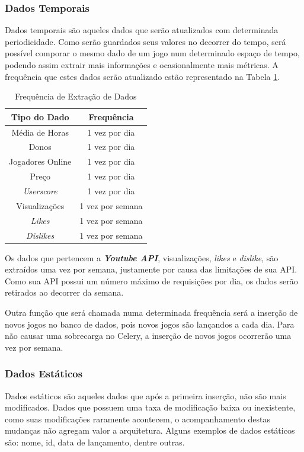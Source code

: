 \subsubsection{Dados Temporais}
Dados temporais são aqueles dados que serão atualizados com determinada periodicidade. Como serão guardados seus valores no decorrer do tempo, será possível comporar o mesmo dado de um jogo num determinado espaço de tempo, podendo assim extrair mais informações e ocasionalmente mais métricas. A frequência que estes dados serão atualizado estão representado na Tabela \ref{table:frequencia}.
\begin{table} [H]
\centering
\caption{Frequência de Extração de Dados}
\label{table:frequencia}

\begin{tabular} {c|c}
\hline \textbf{Tipo do Dado}&\textbf{Frequência} \\
\hline Média de Horas&1 vez por dia \\
\hline Donos&1 vez por dia \\
\hline Jogadores Online&1 vez por dia \\
\hline Preço&1 vez por dia \\
\hline \textit{Userscore}&1 vez por dia \\
\hline Visualizações&1 vez por semana \\
\hline \textit{Likes}&1 vez por semana \\
\hline \textit{Dislikes}&1 vez por semana \\
\hline 
\end{tabular}
\end{table}

Os dados que pertencem a \textit{\textbf{Youtube API}}, visualizações, \textit{likes} e \textit{dislike}, são extraídos uma vez por semana, justamente por causa das limitações de sua API. Como sua API possui um número máximo de requisições por dia, os dados serão retirados ao decorrer da semana.

Outra função que será chamada numa determinada frequência será a inserção de novos jogos no banco de dados, pois novos jogos são lançandos a cada dia. Para não causar uma sobrecarga no Celery, a inserção de novos jogos ocorrerão uma vez por semana.
\subsubsection{Dados Estáticos}
Dados estáticos são aqueles dados que após a primeira inserção, não são mais modificados. Dados que possuem uma taxa de modificação baixa ou inexistente, como suas modificações raramente acontecem, o acompanhamento destas mudanças não agregam valor a arquitetura. Alguns exemplos de dados estáticos são: nome, id, data de lançamento, dentre outras.
